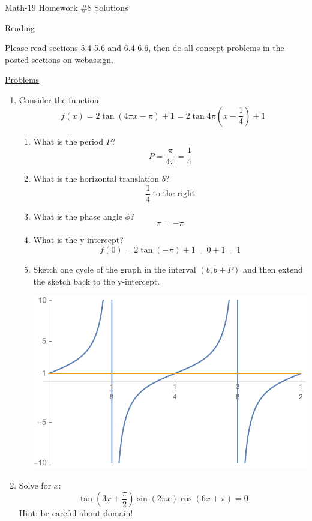 \documentclass[letterpaper,12pt,fleqn]{article}
\begin{document}
\begin{center}
\Large Math-19 Homework \#8 Solutions
\end{center}

\vspace{0.5in}

\underline{Reading}

Please read sections 5.4-5.6 and 6.4-6.6, then do all concept problems in the
posted sections on web\-assign.

\underline{Problems}

\begin{enumerate}
\item Consider the function:
\[f(x)=2\tan(4\pi x-\pi)+1=2\tan4\pi\left(x-\frac{1}{4}\right)+1\]
\begin{enumerate}
\item What is the period $P$?
  \[P=\frac{\pi}{4\pi}=\frac{1}{4}\]
  
\item What is the horizontal translation $b$?
  \[\frac{1}{4}\ \mbox{to the right}\]
  
\item What is the phase angle $\phi$?
  \[\pi=-\pi\]

\item What is the y-intercept?
  \[f(0)=2\tan(-\pi)+1=0+1=1\]
  
\item Sketch one cycle of the graph in the interval $(b,b+P)$ and then extend
  the sketch back to the y-intercept.
  
\includegraphics{tan}
\end{enumerate}

\item Solve for $x$:
\[\tan\left(3x+\frac{\pi}{2}\right)\sin(2\pi x)\cos(6x+\pi)=0\]
Hint: be careful about domain!


\end{enumerate}
\end{document}
